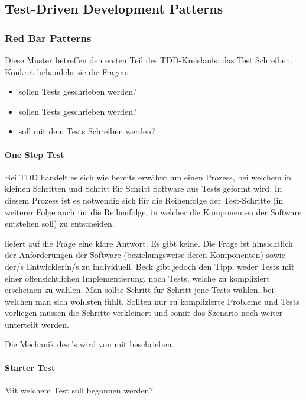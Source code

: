 \subsection{Test-Driven Development Patterns}
\subsubsection{Red Bar Patterns}

Diese Muster betreffen den ersten Teil des TDD-Kreislaufs: das Test Schreiben.
Konkret behandeln sie die Fragen:
\begin{itemize}
  \item {} sollen Tests geschrieben werden?
  \item {} sollen Tests geschrieben werden?
  \item {} soll mit dem Tests Schreiben  werden?
\end{itemize}

\paragraph{One Step Test}
Bei TDD handelt es sich wie bereits erwähnt um einen Prozess, bei welchem in kleinen Schritten und Schritt für Schritt Software aus Tests geformt wird. In diesem Prozess ist es notwendig sich für die Reihenfolge der Test-Schritte (in weiterer Folge auch für die Reihenfolge, in welcher die Komponenten der Software entstehen soll) zu entscheiden.

\cite[134]{Beck:2003} liefert auf die Frage  eine klare Antwort: Es gibt keine.
Die Frage ist hinsichtlich der Anforderungen der Software (beziehungsweise deren Komponenten) sowie der/s Entwicklerin/s zu individuell.
Beck gibt jedoch den Tipp, weder Tests mit einer offensichtlichen Implementierung, noch Tests, welche zu kompliziert erscheinen zu wählen.
Man sollte Schritt für Schritt jene Tests wählen, bei welchen man sich wohlsten fühlt.
Sollten nur zu komplizierte Probleme und Tests vorliegen müssen die Schritte verkleinert und somit das Szenario noch weiter unterteilt werden.

Die Mechanik des 's wird von \cite[134]{Beck:2003} mit  beschrieben.

\paragraph{Starter Test}
Mit welchem Test soll begonnen werden?

